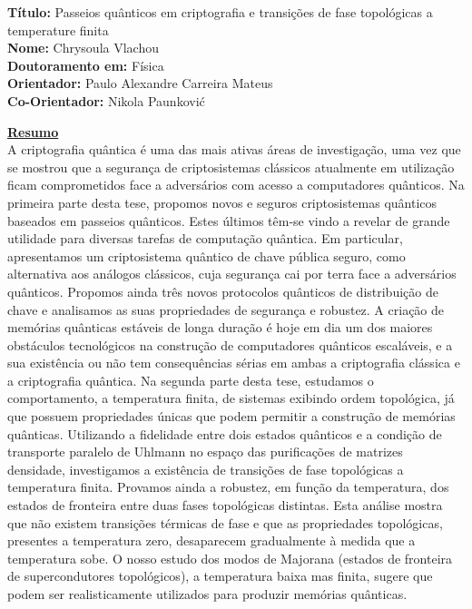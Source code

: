 \documentclass[12pt]{report}
\begin{document}
	



\noindent \textbf{T\'{i}tulo:} Passeios qu\^{a}nticos em criptografia e transi\c{c}\~{o}es de fase topol\'{o}gicas a temperature finita\\
\textbf{Nome:} Chrysoula Vlachou\\
\textbf{Doutoramento em:} F\'{i}sica\\
\textbf{Orientador:} Paulo Alexandre Carreira Mateus\\
\textbf{Co-Orientador:} Nikola Paunkovi\'c\\
\vspace{2\baselineskip}

\underline{\textbf{Resumo}}\\
A criptografia qu\^{a}ntica \'{e} uma das mais ativas \'{a}reas de investiga\c{c}\~{a}o, uma vez que se mostrou que a segurança de criptosistemas cl\'{a}ssicos atualmente em utiliza\c{c}\~{a}o ficam comprometidos face a advers\'{a}rios com acesso a computadores qu\^{a}nticos. Na primeira parte desta tese, propomos novos e seguros criptosistemas qu\^{a}nticos baseados em passeios qu\^{a}nticos. Estes \'{u}ltimos t\^{e}m-se vindo a revelar de grande utilidade para diversas tarefas de computa\c{c}\~{a}o qu\^{a}ntica. Em particular, apresentamos um criptosistema qu\^{a}ntico de chave p\'{u}blica seguro, como alternativa aos an\'{a}logos cl\'{a}ssicos, cuja seguran\c{c}a cai por terra face a advers\'{a}rios qu\^{a}nticos. Propomos ainda tr\^{e}s novos protocolos qu\^{a}nticos de distribui\c{c}\~{a}o de chave e analisamos as suas propriedades de seguran\c{c}a e robustez.
A cria\c{c}\~{a}o de mem\'{o}rias qu\^{a}nticas est\'{a}veis de longa dura\c{c}\~{a}o é hoje em dia um dos maiores obst\'{a}culos tecnol\'{o}gicos na constru\c{c}\~{a}o de computadores qu\^{a}nticos escal\'{a}veis, e a sua exist\^{e}ncia ou n\~{a}o tem consequ\^{e}ncias s\'{e}rias em ambas a criptografia cl\'{a}ssica e a criptografia qu\^{a}ntica. Na segunda parte desta tese, estudamos o comportamento, a temperatura finita, de sistemas exibindo ordem topol\'{o}gica, j\'{a} que possuem propriedades \'{u}nicas que podem permitir a constru\c{c}\~{a}o de mem\'{o}rias qu\^{a}nticas. Utilizando a fidelidade entre dois estados qu\^{a}nticos e a condi\c{c}\~{a}o de transporte paralelo de Uhlmann no espa\c{c}o das purifica\c{c}\~{o}es de matrizes densidade, investigamos a exist\^{e}ncia de transi\c{c}\~{o}es de fase topol\'{o}gicas a temperatura finita. Provamos ainda a robustez, em fun\c{c}\~{a}o da temperatura, dos estados de fronteira entre duas fases topol\'{o}gicas distintas. Esta an\'{a}lise mostra que n\~{a}o existem transi\c{c}\~{o}es t\'{e}rmicas de fase e que as propriedades topol\'{o}gicas, presentes a temperatura zero, desaparecem gradualmente \`{a} medida que a temperatura sobe. O nosso estudo dos modos de Majorana (estados de fronteira de supercondutores topol\'{o}gicos), a temperatura baixa mas finita, sugere que podem ser realisticamente utilizados para produzir mem\'{o}rias qu\^{a}nticas.
\end{document}
